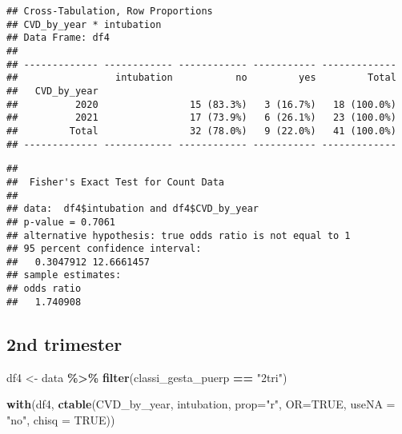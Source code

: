 \documentclass[
]{article}
\newenvironment{Shaded}{\begin{snugshade}}{\end{snugshade}}
\newcommand{\AttributeTok}[1]{\textcolor[rgb]{0.13,0.29,0.53}{#1}}
\newcommand{\ConstantTok}[1]{\textcolor[rgb]{0.56,0.35,0.01}{#1}}
\newcommand{\FunctionTok}[1]{\textcolor[rgb]{0.13,0.29,0.53}{\textbf{#1}}}
\newcommand{\NormalTok}[1]{#1}
\newcommand{\OtherTok}[1]{\textcolor[rgb]{0.56,0.35,0.01}{#1}}
\newcommand{\SpecialCharTok}[1]{\textcolor[rgb]{0.81,0.36,0.00}{\textbf{#1}}}
\newcommand{\StringTok}[1]{\textcolor[rgb]{0.31,0.60,0.02}{#1}}
\begin{document}
\begin{verbatim}
## Cross-Tabulation, Row Proportions  
## CVD_by_year * intubation  
## Data Frame: df4  
## 
## ------------- ------------ ------------ ----------- -------------
##                 intubation           no         yes         Total
##   CVD_by_year                                                    
##          2020                15 (83.3%)   3 (16.7%)   18 (100.0%)
##          2021                17 (73.9%)   6 (26.1%)   23 (100.0%)
##         Total                32 (78.0%)   9 (22.0%)   41 (100.0%)
## ------------- ------------ ------------ ----------- -------------
\end{verbatim}

\begin{Shaded}
\end{Shaded}

\begin{verbatim}
## 
##  Fisher's Exact Test for Count Data
## 
## data:  df4$intubation and df4$CVD_by_year
## p-value = 0.7061
## alternative hypothesis: true odds ratio is not equal to 1
## 95 percent confidence interval:
##   0.3047912 12.6661457
## sample estimates:
## odds ratio 
##   1.740908
\end{verbatim}

\hypertarget{nd-trimester-7}{%
\subsection{2nd trimester}\label{nd-trimester-7}}

\begin{Shaded}
\begin{Highlighting}[]
\NormalTok{df4 }\OtherTok{\textless{}{-}}\NormalTok{ data }\SpecialCharTok{\%\textgreater{}\%} 
  \FunctionTok{filter}\NormalTok{(classi\_gesta\_puerp }\SpecialCharTok{==} \StringTok{"2tri"}\NormalTok{)}

\FunctionTok{with}\NormalTok{(df4, }\FunctionTok{ctable}\NormalTok{(CVD\_by\_year, intubation, }\AttributeTok{prop=}\StringTok{"r"}\NormalTok{, }\AttributeTok{OR=}\ConstantTok{TRUE}\NormalTok{, }\AttributeTok{useNA =} \StringTok{"no"}\NormalTok{, }\AttributeTok{chisq =} \ConstantTok{TRUE}\NormalTok{))}
\end{Highlighting}
\end{Shaded}
\end{document}
